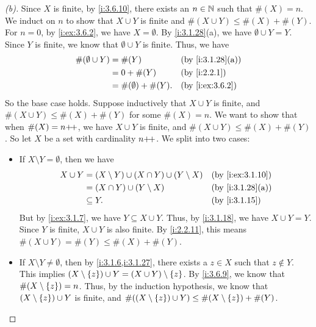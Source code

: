\begin{proof}[(b)]
  Since \(X\) is finite, by \cref{i:3.6.10}, there exists an \(n \in \mathbb{N}\) such that \(\#(X) = n\).
  We induct on \(n\) to show that \(X \cup Y\) is finite and \(\#(X \cup Y) \leq \#(X) + \#(Y)\).
  For \(n = 0\), by \cref{i:ex:3.6.2}, we have \(X = \emptyset\).
  By \cref{i:3.1.28}(a), we have \(\emptyset \cup Y = Y\).
  Since \(Y\) is finite, we know that \(\emptyset \cup Y\) is finite.
  Thus, we have
  \begin{align*}
    \#(\emptyset \cup Y) & = \#(Y)                  &  & \by{i:3.1.28}[a] \\
                         & = 0 + \#(Y)              &  & \by{i:2.2.1}     \\
                         & = \#(\emptyset) + \#(Y). &  & \by{i:ex:3.6.2}
  \end{align*}
  So the base case holds.
  Suppose inductively that \(X \cup Y\) is finite, and \(\#(X \cup Y) \leq \#(X) + \#(Y)\) for some \(\#(X) = n\).
  We want to show that when \(\#(X) = n{+}\!{+}\), we have \(X \cup Y\) is finite, and \(\#(X \cup Y) \leq \#(X) + \#(Y)\).
  So let \(X\) be a set with cardinality \(n{+}\!{+}\).
  We split into two cases:
  \begin{itemize}
    \item If \(X \setminus Y = \emptyset\), then we have
          \begin{align*}
            X \cup Y & = (X \setminus Y) \cup (X \cap Y) \cup (Y \setminus X) &  & \by{i:ex:3.1.10} \\
                     & = (X \cap Y) \cup (Y \setminus X)                      &  & \by{i:3.1.28}[a] \\
                     & \subseteq Y.                                           &  & \by{i:3.1.15}
          \end{align*}
          But by \cref{i:ex:3.1.7}, we have \(Y \subseteq X \cup Y\).
          Thus, by \cref{i:3.1.18}, we have \(X \cup Y = Y\).
          Since \(Y\) is finite, \(X \cup Y\) is also finite.
          By \cref{i:2.2.11}, this means \(\#(X \cup Y) = \#(Y) \leq \#(X) + \#(Y)\).
    \item If \(X \setminus Y \neq \emptyset\), then by \cref{i:3.1.6,i:3.1.27}, there exists a \(z \in X\) such that \(z \notin Y\).
          This implies \((X \setminus \left\lbrace z\right\rbrace) \cup Y = (X \cup Y) \setminus \left\lbrace z\right\rbrace\).
          By \cref{i:3.6.9}, we know that \(\#(X \setminus \left\lbrace z\right\rbrace) = n\).
          Thus, by the induction hypothesis, we know that \((X \setminus \left\lbrace z\right\rbrace) \cup Y\) is finite, and \(\#((X \setminus \left\lbrace z\right\rbrace) \cup Y) \leq \#(X \setminus \left\lbrace z\right\rbrace) + \#(Y)\).

\end{itemize}
\end{proof}
